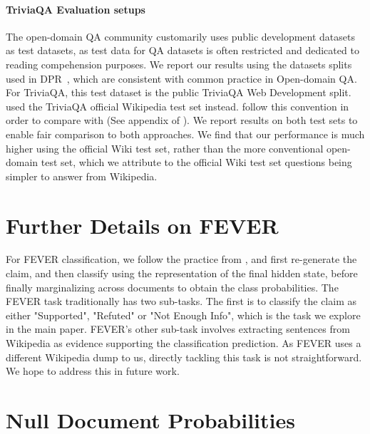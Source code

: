 \paragraph{TriviaQA Evaluation setups} The open-domain QA community customarily uses public development datasets as test datasets, as test data for QA datasets is often restricted and dedicated to reading compehension purposes. We report our results using the datasets splits used in DPR~\cite{Karpukhin20dense}, which are consistent with common practice in Open-domain QA. For TriviaQA, this test dataset is the public TriviaQA Web Development split.  
\citet{roberts2020t5cqba} used the TriviaQA official Wikipedia test set instead. \citet{fevry2020entities} follow this convention in order to compare with \citet{roberts2020t5cqba} (See appendix of \cite{fevry2020entities}). We report results on both test sets to enable fair comparison to both approaches. We find that our performance is much higher using the official Wiki test set, rather than the more conventional open-domain test set, which we attribute to the official Wiki test set questions being simpler to answer from Wikipedia.

\section{Further Details on FEVER}

For FEVER classification, we follow the practice from \cite{lewis2019bart}, and first re-generate the claim, and then classify using the representation of the final hidden state, before finally marginalizing across documents to obtain the class probabilities. 
The FEVER task traditionally has two sub-tasks. The first is to classify the claim as either "Supported", "Refuted" or "Not Enough Info", which is the task we explore in the main paper. FEVER's other sub-task involves extracting sentences from Wikipedia as evidence supporting the classification prediction. As FEVER uses a different Wikipedia dump to us, directly tackling this task is not straightforward. We hope to address this in future work.

\section{Null Document Probabilities}

